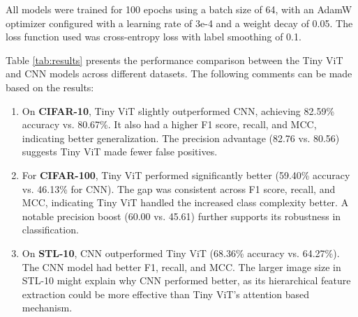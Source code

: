 All models were trained for 100 epochs using a batch size of 64, with an AdamW optimizer configured with a learning rate of 3e-4 and a weight decay of 0.05. The loss function used was cross-entropy loss with label smoothing of 0.1.

Table \ref{tab:results} presents the performance comparison between the Tiny ViT and CNN models across different datasets. The following comments can be made based on the results:
\begin{enumerate}
  \item On \textbf{CIFAR-10}, Tiny ViT slightly outperformed CNN, achieving 82.59\% accuracy vs. 80.67\%. It also had a higher F1 score, recall, and MCC, indicating better generalization. The precision advantage (82.76 vs. 80.56) suggests Tiny ViT made fewer false positives.
  \item For \textbf{CIFAR-100}, Tiny ViT performed significantly better (59.40\% accuracy vs. 46.13\% for CNN). The gap was consistent across F1 score, recall, and MCC, indicating Tiny ViT handled the increased class complexity better. A notable precision boost (60.00 vs. 45.61) further supports its robustness in classification.
  \item On \textbf{STL-10}, CNN outperformed Tiny ViT (68.36\% accuracy vs. 64.27\%). The CNN model had better F1, recall, and MCC. The larger image size in STL-10 might explain why CNN performed better, as its hierarchical feature extraction could be more effective than Tiny ViT’s attention based mechanism.
\end{enumerate}

